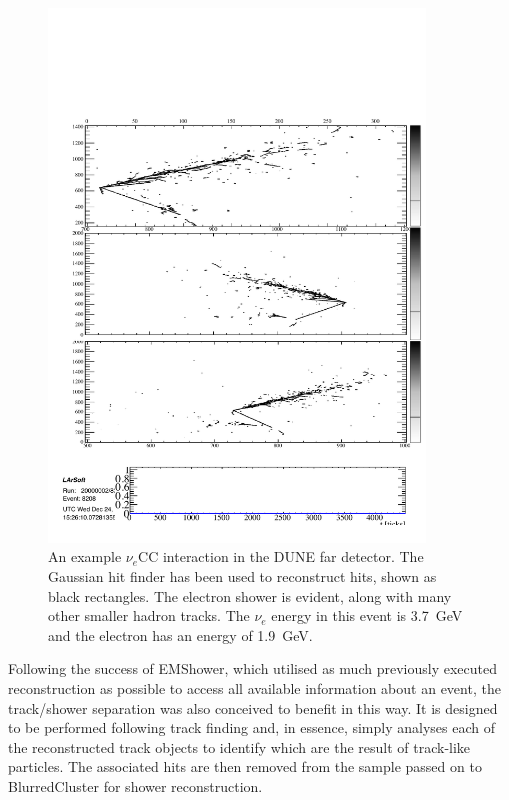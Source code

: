 \begin{figure}
  \centering
  \includegraphics[width=10cm]{NuECCHits.pdf}
  \caption[An example $\nu_e$CC interaction in the DUNE far detector.]{An example $\nu_e$CC interaction in the DUNE far detector.  The Gaussian hit finder has been used to reconstruct hits, shown as black rectangles.  The electron shower is evident, along with many other smaller hadron tracks.  The $\nu_e$ energy in this event is 3.7~GeV and the electron has an energy of 1.9~GeV.}
  \label{fig:nueCC}
\end{figure}

Following the success of EMShower, which utilised as much previously executed reconstruction as possible to access all available information about an event, the track/shower separation was also conceived to benefit in this way.  It is designed to be performed following track finding and, in essence, simply analyses each of the reconstructed track objects to identify which are the result of track-like particles.  The associated hits are then removed from the sample passed on to BlurredCluster for shower reconstruction.

